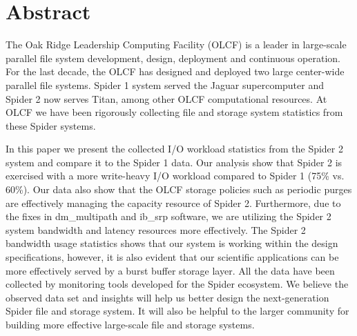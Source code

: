 \section*{Abstract}
\label{sec:abstract}

The Oak Ridge Leadership Computing Facility (OLCF) is a leader in large-scale
parallel file system development, design, deployment and continuous operation.
For the last decade, the OLCF has designed and deployed two large center-wide
parallel file systems. Spider 1 system served the Jaguar supercomputer and
Spider 2 now serves Titan, among other OLCF computational resources. At OLCF
we have been rigorously collecting file and storage system statistics from
these Spider systems.

In this paper we present the collected I/O workload statistics from the Spider
2 system and compare it to the Spider 1 data. Our analysis show that Spider 2
is exercised with a more write-heavy I/O workload compared to Spider 1 (75\%
vs. 60\%). Our data also show that the OLCF storage policies such as periodic
purges are effectively managing the capacity resource of Spider 2.
Furthermore, due to the fixes in dm\_multipath and ib\_srp software, we are
utilizing the Spider 2 system bandwidth and latency resources more
effectively. The Spider 2 bandwidth usage statistics shows that our system is
working within the design specifications, however, it is also evident that our
scientific applications can be more effectively served by a burst buffer
storage layer. All the data have been collected by monitoring tools developed
for the Spider ecosystem. We believe the observed data set and insights will
help us better design the next-generation Spider file and storage system. It
will also be helpful to the larger community for building more effective
large-scale file and storage systems.

 
